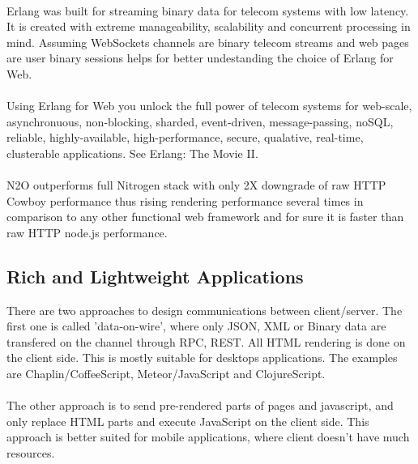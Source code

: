 
\newpage
\paragraph{}
Erlang was built for streaming binary data for telecom systems with
low latency. It is created with extreme manageability, scalability
and concurrent processing in mind. Assuming WebSockets channels are binary
telecom streams and web pages are user binary sessions
helps for better undestanding the choice of Erlang for Web.

\paragraph{}
Using Erlang for Web you unlock the full power of telecom systems for
web-scale, asynchronuous, non-blocking, sharded, event-driven,
message-passing, noSQL, reliable, highly-available, high-performance,
secure, qualative, real-time, clusterable applications. See Erlang: The Movie II.

\paragraph{}
N2O outperforms full Nitrogen stack with only 2X downgrade of raw
HTTP Cowboy performance thus rising rendering performance several
times in comparison to any other functional web framework and for
sure it is faster than raw HTTP node.js performance.

\subsection*{Rich and Lightweight Applications}
There are two approaches to design communications between client/server.
The first one is called 'data-on-wire', where only JSON, XML or Binary
data are transfered on the channel through RPC, REST. All HTML rendering
is done on the client side. This is mostly suitable for desktops
applications. The examples are Chaplin/CoffeeScript, Meteor/JavaScript
and ClojureScript.

\paragraph{}
The other approach is to send pre-rendered parts of pages and javascript,
and only replace HTML parts and execute JavaScript on the client side. This approach
is better suited for mobile applications, where client doesn't have much resources.

